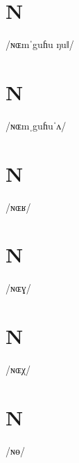 \documentclass[10pt,a4paper,twoside]{book}
\begin{document}
\section*{N}

\begin{multicols}{3}
 {/ɴɶmˈguɦu ŋuǁ/} {}
\end{multicols}

\section*{N}

\begin{multicols}{3}
 {/ɴɶmˌguɦuˈʌ/} {}
\end{multicols}

\section*{N}

\begin{multicols}{3}
 {/ɴɶʁ/} {}
\end{multicols}

\section*{N}

\begin{multicols}{3}
 {/ɴɶɣ/} {}
\end{multicols}

\section*{N}

\begin{multicols}{3}
 {/ɴɶχ/} {}
\end{multicols}

\section*{N}

\begin{multicols}{3}
 {/ɴɵ/} {}
\end{multicols}
\end{document}
